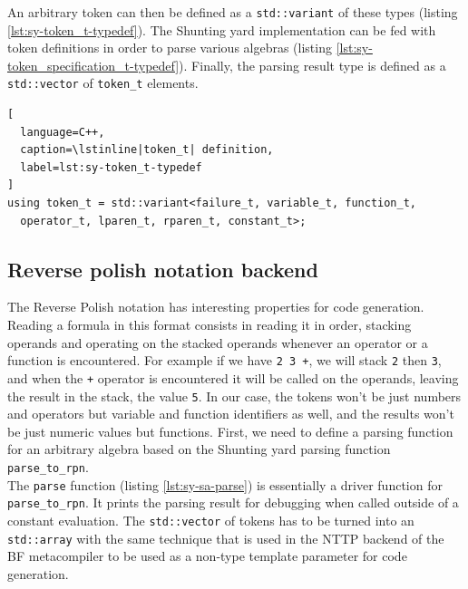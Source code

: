 \documentclass[../../main.tex]{subfiles}
\begin{document}
An arbitrary token can then be defined as a \lstinline|std::variant| of these
types (listing \ref{lst:sy-token_t-typedef}). The Shunting yard implementation
can be fed with token definitions in order to parse various algebras
(listing \ref{lst:sy-token_specification_t-typedef}). Finally, the parsing result
type is defined as a \lstinline|std::vector| of \lstinline|token_t| elements.

\begin{lstlisting}[
  language=C++,
  caption=\lstinline|token_t| definition,
  label=lst:sy-token_t-typedef
]
using token_t = std::variant<failure_t, variable_t, function_t,
  operator_t, lparen_t, rparen_t, constant_t>;
\end{lstlisting}



\subsection{Reverse polish notation backend}

The Reverse Polish notation has interesting properties for code generation.
Reading a formula in this format consists in reading it in order, stacking
operands and operating on the stacked operands whenever an operator or a
function is encountered. For example if we have \lstinline|2 3 +|, we will stack
\lstinline|2| then \lstinline|3|, and when the \lstinline|+| operator is
encountered it will be called on the operands, leaving the result in the stack,
\ie the value \lstinline|5|.
In our case, the tokens won't be just numbers and operators but variable and
function identifiers as well, and the results won't be just numeric values but
functions. First, we need to define a \constexpr parsing function for an
arbitrary algebra based on the \constexpr Shunting yard parsing function
\ie \lstinline|parse_to_rpn|.\\

The \lstinline|parse| function (listing \ref{lst:sy-sa-parse}) is
essentially a driver function for \lstinline|parse_to_rpn|. It prints the
parsing result for debugging when called outside of a constant evaluation.
The \lstinline|std::vector| of tokens has to be turned into an
\lstinline|std::array| with the same technique that is used in the NTTP backend
of the BF metacompiler to be used as a non-type template parameter for code
generation.\\
\end{document}

